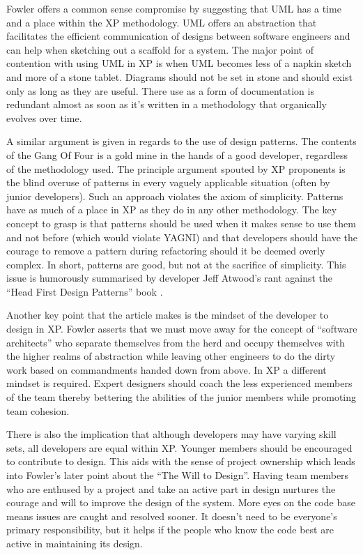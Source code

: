 \documentclass[paper=a4, fontsize=11pt]{scrartcl}	%
\numberwithin{equation}{section}															%
\numberwithin{figure}{section}																%
\numberwithin{table}{section}
\begin{document}
Fowler offers a common sense compromise by suggesting that UML has a time and a place within the XP methodology. UML offers an abstraction that facilitates the efficient communication of designs between software engineers and can help when sketching out a scaffold for a system. The major point of contention with using UML in XP is when UML becomes less of a napkin sketch and more of a stone tablet. Diagrams should not be set in stone and should exist only as long as they are useful. There use as a form of documentation is redundant almost as soon as it's written in a methodology that organically evolves over time.

A similar argument is given in regards to the use of design patterns. The contents of the Gang Of Four \cite{gamma1994design} is a gold mine in the hands of a good developer, regardless of the methodology used. The principle argument spouted by XP proponents is the blind overuse of patterns in every vaguely applicable situation (often by junior developers). Such an approach violates the axiom of simplicity. Patterns have as much of a place in XP as they do in any other methodology. The key concept to grasp is that patterns should be used when it makes sense to use them and not before (which would violate YAGNI) and that developers should have the courage to remove a pattern during refactoring should it be deemed overly complex. In short, patterns are good, but not at the sacrifice of simplicity. This issue is humorously summarised by developer Jeff Atwood's rant against the ``Head First Design Patterns'' book \cite{atwood2005head}.

Another key point that the article makes is the mindset of the developer to design in XP. Fowler asserts that we must move away for the concept of ``software architects'' who separate themselves from the herd and occupy themselves with the higher realms of abstraction while leaving other engineers to do the dirty work based on commandments handed down from above. In XP a different mindset is required. Expert designers should coach the less experienced members of the team thereby bettering the abilities of the junior members while promoting team cohesion. 

There is also the implication that although developers may have varying skill sets, all developers are equal within XP. Younger members should be encouraged to contribute to design. This aids with the sense of project ownership which leads into Fowler's later point about the ``The Will to Design''.  Having team members who are enthused by a project and take an active part in design nurtures the courage and will to improve the design of the system. More eyes on the code base means issues are caught and resolved sooner. It doesn't need to be everyone's primary responsibility, but it helps if the people who know the code best are active in maintaining its design.
\end{document}
